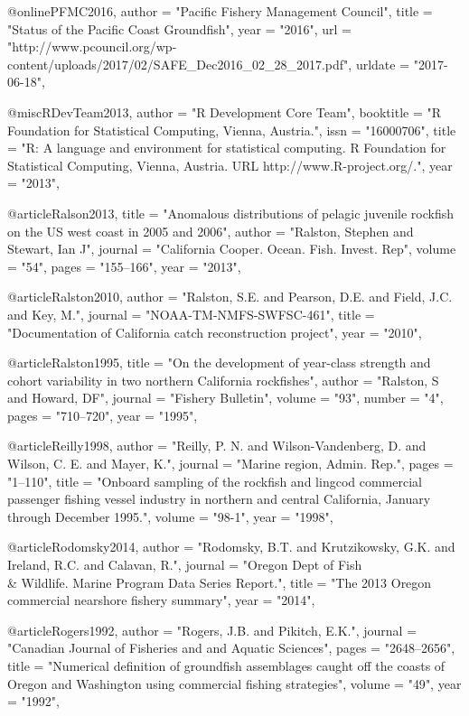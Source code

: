 {@online{PFMC2016,
    author = "{Pacific Fishery Management Council}",
    title = "{{Status of the Pacific Coast Groundfish\nFishery}}",
    year = "2016",
    url = "{http://www.pcouncil.org/wp-content/uploads/2017/02/SAFE_Dec2016_02_28_2017.pdf}",
    urldate = "{2017-06-18}",
}

@misc{RDevTeam2013, 
    author = "{{R Development Core Team}}",
    booktitle = "{R Foundation for Statistical Computing, Vienna, Austria.}",
    issn = "{16000706}",
    title = "{{R: A language and environment for statistical computing. R Foundation for Statistical Computing, Vienna, Austria. URL http://www.R-project.org/.}}",
    year = "{2013}",
}

@article{Ralson2013,
    title = "{Anomalous distributions of pelagic juvenile rockfish on the US west coast in 2005 and 2006}",
    author = "{Ralston, Stephen and Stewart, Ian J}",
    journal = "{California Cooper. Ocean. Fish. Invest. Rep}",
    volume = "{54}",
    pages = "{155--166}",
    year = "{2013}",
}

@article{Ralston2010,
    author = "{Ralston, S.E. and Pearson, D.E. and Field, J.C. and Key, M.}",
    journal = "{NOAA-TM-NMFS-SWFSC-461}",
    title = "{{Documentation of California catch reconstruction project}}",
    year = "{2010}",
}

@article{Ralston1995,
    title = "{On the development of year-class strength and cohort variability in two northern California rockfishes}",
    author = "{Ralston, S and Howard, DF}",
    journal = "{Fishery Bulletin}",
    volume = "{93}",
    number = "{4}",
    pages = "{710--720}",
    year = "{1995}",
}

@article{Reilly1998,
    author = "{Reilly, P. N. and Wilson-Vandenberg, D. and Wilson, C. E. and Mayer, K.}",
    journal = "{Marine region, Admin. Rep.}",
    pages = "{1--110}",
    title = "{{Onboard sampling of the rockfish and lingcod commercial passenger fishing vessel industry in northern and central California, January through December 1995.}}",
    volume = "{98-1}",
    year = "{1998}",
}

@article{Rodomsky2014,
    author = "{Rodomsky, B.T. and Krutzikowsky, G.K. and Ireland, R.C. and Calavan, R.}",
    journal = "{Oregon Dept of Fish \\& Wildlife. Marine Program Data Series Report.}",
    title = "{{The 2013 Oregon commercial nearshore fishery summary}}",
    year = "{2014}",
}

@article{Rogers1992,
    author = "{Rogers, J.B. and Pikitch, E.K.}",
    journal = "{Canadian Journal of Fisheries and and Aquatic Sciences}",
    pages = "{2648--2656}",
    title = "{{Numerical definition of groundfish assemblages caught off the coasts of Oregon and Washington using commercial fishing strategies}}",
    volume = "{49}",
    year = "{1992}",
}

}
